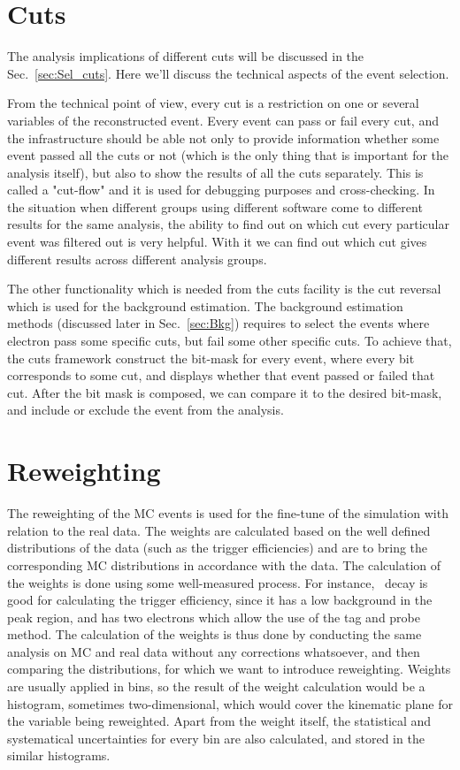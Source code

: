 \section{Cuts}

The analysis implications of different cuts will be discussed in the Sec.~\ref{sec:Sel_cuts}. Here we'll discuss the technical aspects of the event selection.

From the technical point of view, every cut is a restriction on one or several variables of the reconstructed event. Every event can pass or fail every cut, and the infrastructure should be able not only to provide information whether some event passed all the cuts or not (which is the only thing that is important for the analysis itself), but also to show the results of all the cuts separately. This is called a "cut-flow" and it is used for debugging purposes and cross-checking. In the situation when different groups using different software come to different results for the same analysis, the ability to find out on which cut every particular event was filtered out is very helpful. With it we can find out which cut gives different results across different analysis groups.

The other functionality which is needed from the cuts facility is the cut reversal which is used for the background estimation. The background estimation methods (discussed later in Sec.~\ref{sec:Bkg}) requires to select the events where electron pass some specific cuts, but fail some other specific cuts. To achieve that, the cuts framework construct the bit-mask for every event, where every bit corresponds to some cut, and displays whether that event passed or failed that cut. After the bit mask is composed, we can compare it to the desired bit-mask, and include or exclude the event from the analysis.

\section{Reweighting}

The reweighting of the MC events is used for the fine-tune of the simulation with relation to the real data. The weights are calculated based on the well defined distributions of the data (such as the trigger efficiencies) and are to bring the corresponding MC distributions in accordance with the data. The calculation of the weights is done using some well-measured process. For instance, \Zee\ decay is good for calculating the trigger efficiency, since it has a low background in the peak region, and has two electrons which allow the use of the tag and probe method. The calculation of the weights is thus done by conducting the same analysis on MC and real data without any corrections whatsoever, and then comparing the distributions, for which we want to introduce reweighting. Weights are usually applied in bins, so the result of the weight calculation would be a histogram, sometimes two-dimensional, which would cover the kinematic plane for the variable being reweighted. Apart from the weight itself, the statistical and systematical uncertainties for every bin are also calculated, and stored in the similar histograms.

